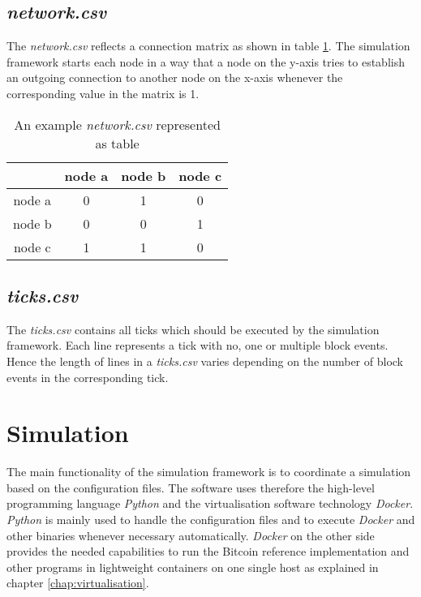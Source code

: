 \subsection{\textit{network.csv}}
The \textit{network.csv} reflects a connection matrix as shown in table \ref{tab:network_csv}.
The simulation framework starts each node in a way that a node on the y-axis tries to establish an outgoing connection to another node on the x-axis whenever the corresponding value in the matrix is 1.

\begin{table}
  \centering
  \begin{tabular}{c|ccc}
    			& node a 	& node b	& node c	\\
    \hline
    node a		& 0			& 1         & 0         \\
    node b      & 0         & 0         & 1			\\
    node c      & 1         & 1			& 0         \\
  \end{tabular}
  \caption{An example \textit{network.csv} represented as table}
  \label{tab:network_csv}
\end{table}

\subsection{\textit{ticks.csv}}

The \textit{ticks.csv} contains all ticks which should be executed by the simulation framework.
Each line represents a tick with no, one or multiple block events.
Hence the length of lines in a \textit{ticks.csv} varies depending on the number of block events in the corresponding tick.

\section{Simulation}
\label{chap:simulation}

The main functionality of the simulation framework is to coordinate a simulation based on the configuration files.
The software uses therefore the high-level programming language \textit{Python} and the virtualisation software technology \textit{Docker}.
\textit{Python} is mainly used to handle the configuration files and to execute \textit{Docker} and other binaries whenever necessary automatically.
\textit{Docker} on the other side provides the needed capabilities to run the Bitcoin reference implementation and other programs in lightweight containers on one single host as explained in chapter \ref{chap:virtualisation}.
	
